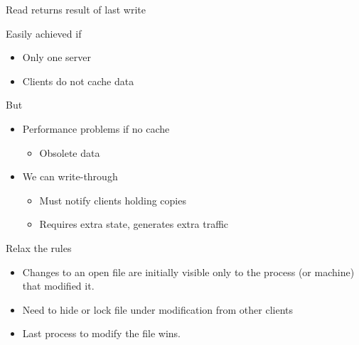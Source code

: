 \begin{slide}
	
	
	Read returns result of last write
	
	Easily achieved if
	\begin{itemize}
		\item Only one server
		\item Clients do not cache data
	\end{itemize}
	\bigskip
	
	But
	\begin{itemize}
		\item Performance problems if no cache
		\begin{itemize}
			\item Obsolete data
		\end{itemize}
		\item We can write-through
		\begin{itemize}
			\item Must notify clients holding copies
			\item Requires extra state, generates extra traffic
		\end{itemize}
	\end{itemize}
	
\end{slide}

\begin{slide}


	Relax the rules
	\begin{itemize}
		\item Changes to an open file are initially visible only to the process (or machine) that modified it.
		\item Need to hide or lock file under modification from other clients
		\item Last process to modify the file wins.
	\end{itemize}
	
\end{slide}

